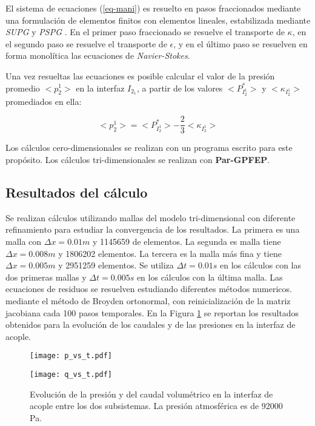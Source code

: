 El sistema de ecuaciones (\ref{eq-mani}) es resuelto en pasos fraccionados \cite{lew} mediante una formulación de elementos finitos con elementos lineales, 
estabilizada mediante \textit{SUPG} \cite{supg} y \textit{PSPG} \cite{pspg}.
En el primer paso fraccionado se resuelve el transporte de $\kappa$,
en el segundo paso se resuelve el transporte de $\epsilon$,
y en el último paso se resuelven en forma monolítica las ecuaciones de \textit{Navier-Stokes}.

Una vez resueltas las ecuaciones es posible calcular el valor de la presión promedio $<p_2^1>$ en la interfaz $I_{2_1}$,
a partir de los valores $<P^*_{I_2^1}>$ y $<\kappa_{I_2^1}>$ promediados en ella:

\begin{equation}
<p_2^1> = <P^*_{I_2^1}> - \frac {2}{3} <\kappa_{I_2^1}>
\end{equation}

Los cálculos cero-dimensionales se realizan con un programa escrito para este propósito.
Los cálculos tri-dimensionales se realizan con \textbf{Par-GPFEP}.

\subsection*{Resultados del cálculo}

Se realizan cálculos utilizando mallas del modelo tri-dimensional con diferente refinamiento para estudiar la convergencia de los resultados.
La primera es una malla con $\Delta x=0.01m$ y 1145659 de elementos. 
La segunda es malla tiene $\Delta x=0.008m$ y 1806202 elementos.
La tercera es la malla más fina y tiene $\Delta x=0.005m$ y 2951259 elementos.
Se utiliza $\Delta t=0.01s$ en los cálculos con las dos primeras mallas y $\Delta t=0.005s$ en los cálculos con la última malla.
Las ecuaciones de residuos se resuelven estudiando diferentes métodos numericos.
mediante el método de Broyden ortonormal, 
con reinicialización de la matriz jacobiana cada 100 pasos temporales.
En la Figura \ref{qpvst} se reportan los resultados obtenidos para la evolución de los caudales y de las presiones en la interfaz de acople.

\begin{figure}[ht]
	\begin{minipage}{0.5\linewidth}
		\centering
		\texttt{[image: p\_vs\_t.pdf]}
		\label{asd}	
	\end{minipage}
	\begin{minipage}{0.5\linewidth}
		\centering
		\texttt{[image: q\_vs\_t.pdf]}
		\label{asd}	
	\end{minipage}
	\caption{Evolución de la presión y del caudal volumétrico en la interfaz de acople entre los dos subsistemas.
  La presión atmosférica es de 92000 Pa.}  
	\label{qpvst}
\end{figure}


